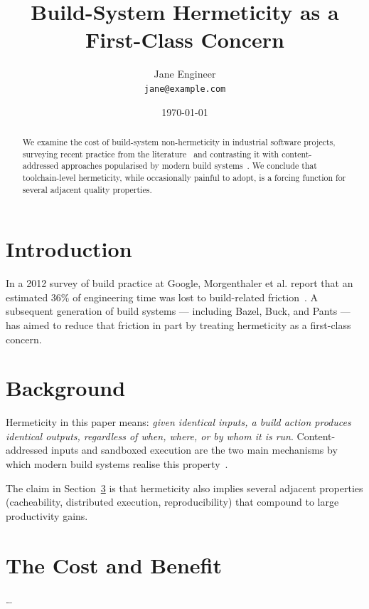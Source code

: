 \documentclass[11pt,a4paper]{article}
\title{Build-System Hermeticity as a First-Class Concern}
\author{Jane Engineer \\ \texttt{jane@example.com}}
\date{\today}
\begin{document}
\maketitle

\begin{abstract}
We examine the cost of build-system non-hermeticity in industrial
software projects, surveying recent practice from
the literature~\cite{morgenthaler2012searching, esfahani2016cloudbuild}
and contrasting it with content-addressed approaches popularised by
modern build systems~\cite{erickson2018bazel}. We conclude that
toolchain-level hermeticity, while occasionally painful to adopt, is
a forcing function for several adjacent quality properties.
\end{abstract}

\section{Introduction}
\label{sec:intro}

In a 2012 survey of build practice at Google, Morgenthaler et al.
report that an estimated 36\% of engineering time was lost to
build-related friction~\cite{morgenthaler2012searching}. A
subsequent generation of build systems --- including Bazel,
Buck, and Pants --- has aimed to reduce that friction in part by
treating hermeticity as a first-class concern.

\section{Background}
\label{sec:background}

Hermeticity in this paper means: \emph{given identical inputs, a
build action produces identical outputs, regardless of when, where,
or by whom it is run}. Content-addressed inputs and sandboxed
execution are the two main mechanisms by which modern build systems
realise this property~\cite{erickson2018bazel}.

The claim in
Section~\ref{sec:cost} is that hermeticity also implies several
adjacent properties (cacheability, distributed execution,
reproducibility) that compound to large productivity gains.

\section{The Cost and Benefit}
\label{sec:cost}

\dots

\printbibliography
\end{document}
